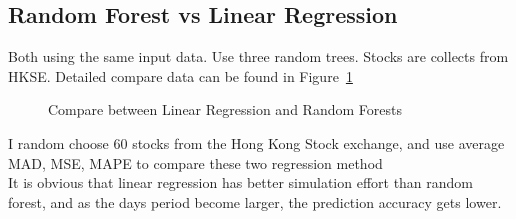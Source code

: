 \documentclass[12pt,a4paper]{scrartcl}
\begin{document}
	\subsection{Random Forest vs Linear Regression}
	Both using the same input data. Use three random trees. Stocks are collects from HKSE. Detailed compare data can be found in Figure~\ref{fig:rt_lg}
	\begin{figure}[ht]
		\centering
		\caption{Compare between Linear Regression and Random Forests}
		\label{fig:rt_lg}
	\end{figure}
	I random choose 60 stocks from the Hong Kong Stock exchange, and use average MAD, MSE, MAPE to compare these two regression method\\
	\indent It is obvious that linear regression has better simulation effort than random forest, and as the days period become larger, the prediction accuracy gets lower.
\end{document}
